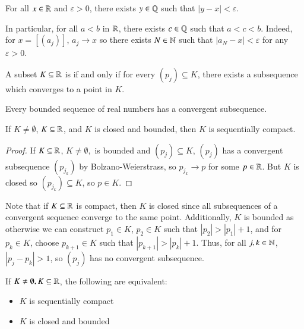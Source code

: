 \begin{prop}
    For all $x \in \mathbb R$ and $\varepsilon > 0$, there exists $y \in \mathbb Q$ such that $|y-x| < \varepsilon$.
\end{prop}
In particular, for all $a < b$ in $\mathbb R$, there exists $c \in \mathbb Q$ such that $a < c < b$. Indeed, for $x = [(a_j)]$, $a_j \rightarrow x$ so there exists $N \in \mathbb N$ such that $|a_N - x| < \varepsilon$ for any $\varepsilon > 0$.

\begin{defn}
    A subset $K \subseteq \mathbb R$ is  if and only if for every  $(p_j) \subseteq K$, there exists a subsequence which converges to a point in $K$.
\end{defn}

\begin{namthm}
    Every bounded sequence of real numbers has a convergent subsequence.
\end{namthm}


\begin{thm}\label{thm:1.9.2}
    If $K \neq \emptyset$, $K \subseteq \mathbb R$, and $K$ is closed and bounded, then $K$ is sequentially compact.
\end{thm}
\begin{proof}
    If $K \subseteq \mathbb R$, $K \neq \emptyset,$ is bounded and $(p_j) \subseteq K$, $(p_j)$ has a convergent subsequence $(p_{j_k})$ by Bolzano-Weierstrass, so $p_{j_k}\rightarrow p$ for some $p \in \mathbb R$. But $K$ is closed so $(p_{j_k}) \subseteq K$, so $p \in K$.
\end{proof}

Note that if $K \subseteq \mathbb R$ is compact, then $K$ is closed since all subsequences of a convergent sequence converge to the same point. Additionally, $K$ is bounded as otherwise we can construct $p_1 \in K$, $p_2 \in K$ such that $|p_2| > |p_1| + 1$, and for $p_k \in K$, choose $p_{k+1} \in K$ such that $|p_{k+1}| > |p_k| + 1$. Thus, for all $j,k \in \mathbb N$, $|p_j - p_k| > 1$, so $(p_j)$ has no convergent subsequence.

\begin{namthm}
    If $K \neq \emptyset, K \subseteq \mathbb R$, the following are equivalent: \begin{itemize}
        \item $K$ is sequentially compact
        \item $K$ is closed and bounded
    \end{itemize}
\end{namthm}

